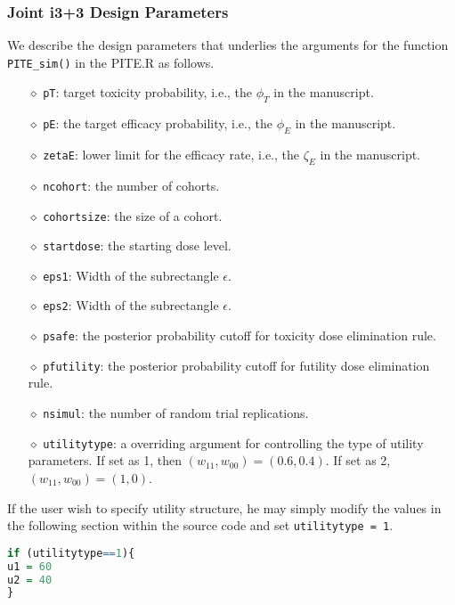 \documentclass[notitlepage]{article}
\begin{document}
 \subsubsection{Joint i3+3 Design Parameters}
 We describe the design parameters that underlies the arguments for the function \texttt{PITE\_sim()} in the  PITE.R as follows.
 \begin{itemize}
\item[$\diamond$] \texttt{pT}: target toxicity probability, i.e., the $\phi_T$ in the manuscript.
\item[$\diamond$] \texttt{pE}: the target  efficacy probability, i.e., the $\phi_E$ in the manuscript.
\item[$\diamond$] \texttt{zetaE}: lower limit for the efficacy rate, i.e., the $\zeta_E$ in the manuscript.
\item[$\diamond$] \texttt{ncohort}: the number of cohorts.
\item[$\diamond$] \texttt{cohortsize}: the size of a cohort.
\item[$\diamond$] \texttt{startdose}: the starting dose level.
\item[$\diamond$] \texttt{eps1}: Width of the subrectangle $\epsilon$.
\item[$\diamond$] \texttt{eps2}: Width of the subrectangle $\epsilon$.
\item[$\diamond$] \texttt{psafe}: the posterior probability cutoff for toxicity dose elimination rule.
\item[$\diamond$] \texttt{pfutility}: the posterior probability cutoff for futility dose elimination rule.
\item[$\diamond$] \texttt{nsimul}: the number of random trial replications.
\item[$\diamond$] \texttt{utilitytype}: a overriding argument for controlling the type of utility parameters. If set as 1, then $(w_{11},w_{00}) = (0.6,0.4)$. If set as 2, $(w_{11},w_{00}) = (1,0)$.
\end{itemize}
If the user wish to specify utility structure, he may simply modify the values in the following section within the source code and set \texttt{utilitytype = 1}.
\begin{lstlisting}[language=R]
if (utilitytype==1){
u1 = 60
u2 = 40
}
\end{lstlisting}
\end{document}

